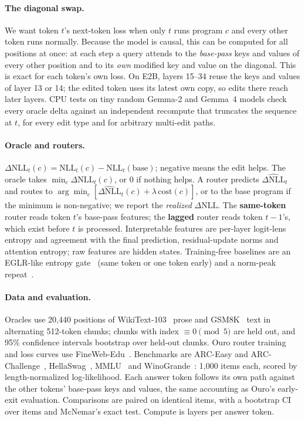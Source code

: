 \documentclass[11pt]{article}
\newcommand{\dnll}{\Delta\mathrm{NLL}}
\begin{document}
\paragraph{The diagonal swap.}
We want token $t$'s next-token loss when only $t$ runs program $c$ and every other token runs normally.
Because the model is causal, this can be computed for all positions at once: at each step a query
attends to the \emph{base-pass} keys and values of every other position and to its \emph{own} modified key
and value on the diagonal. This is exact for each token's own loss. On E2B, layers 15--34 reuse the keys
and values of layer 13 or 14; the edited token uses its latest own copy, so edits there reach later layers.
CPU tests on tiny random Gemma-2 and Gemma~4 models check every oracle delta against an independent
recompute that truncates the sequence at $t$, for every edit type and for arbitrary multi-edit paths.

\paragraph{Oracle and routers.}
$\dnll_t(c) = \mathrm{NLL}_t(c) - \mathrm{NLL}_t(\text{base})$; negative means the edit helps. The oracle takes
$\min_c \dnll_t(c)$, or 0 if nothing helps. A router predicts $\widehat{\dnll}_t$ and routes to
$\arg\min_c [\widehat{\dnll}_t(c) + \lambda\,\mathrm{cost}(c)]$, or to the base program if the minimum is
non-negative; we report the \emph{realized} $\dnll$. The \textbf{same-token} router reads token $t$'s
base-pass features; the \textbf{lagged} router reads token $t-1$'s, which exist before $t$ is processed.
Interpretable features are per-layer logit-lens~\citep{nostalgebraist2020logitlens} entropy and agreement
with the final prediction, residual-update norms and attention entropy; raw features are hidden states.
Training-free baselines are an EGLR-like entropy gate~\citep{bhattacharjee2026eglr} (same token or one
token early) and a norm-peak repeat~\citep{zhang2026telltale}.

\paragraph{Data and evaluation.}
Oracles use 20,440 positions of WikiText-103~\citep{merity2017pointer} prose and GSM8K~\citep{cobbe2021gsm8k}
text in alternating 512-token chunks; chunks with index $\equiv 0 \pmod 5$ are held out, and 95\% confidence
intervals bootstrap over held-out chunks. Ouro router training and loss curves use FineWeb-Edu~\citep{penedo2024fineweb}.
Benchmarks are ARC-Easy and ARC-Challenge~\citep{clark2018arc}, HellaSwag~\citep{zellers2019hellaswag},
MMLU~\citep{hendrycks2021mmlu} and WinoGrande~\citep{sakaguchi2020winogrande}: 1,000 items each, scored by
length-normalized log-likelihood. Each answer token follows its own path against the other tokens'
base-pass keys and values, the same accounting as Ouro's early-exit evaluation. Comparisons are paired on
identical items, with a bootstrap CI over items and McNemar's exact test. Compute is layers per answer token.
\end{document}
